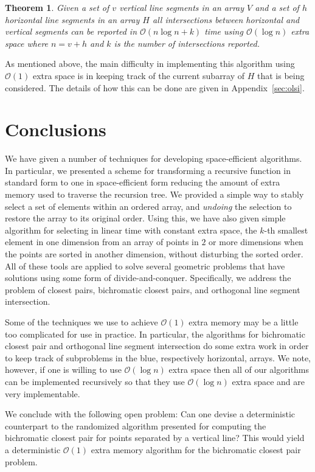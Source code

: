 \documentclass{elsart}
\newcommand{\Oh}[1]{\ensuremath{\mathcal{O}(#1)}}
\newtheorem{theorem}{Theorem}
\begin{document}
\begin{theorem} 
Given a set of $v$ vertical line segments in an array
$V$ and a set of $h$ horizontal line segments in an array $H$
all intersections between horizontal and vertical segments
can be reported in \Oh{n\log n+k} time using \Oh{\log n} extra space
where $n=v+h$ and $k$ is the number of intersections reported.  
\end{theorem}

As mentioned above, the main difficulty in implementing this algorithm
using $\Oh{1}$ extra space is in keeping track of the current subarray
of $H$ that is being considered.  The details of how this can be done
are given in Appendix~\ref{sec:olsi}.


\section{Conclusions}\label{sec:conc}

We have given a number of techniques for developing space-efficient
algorithms.  In particular, we presented a scheme for transforming a
recursive function in standard form to one in space-efficient form
reducing the amount of extra memory used to traverse the recursion
tree.  We provided a simple way to stably select a set of elements
within an ordered array, and {\em undoing} the selection to restore
the array to its original order.  Using this, we have also given
simple algorithm for selecting in linear time with constant extra
space, the $k$-th smallest element in one dimension from an array of
points in $2$ or more dimensions when the points are sorted in another
dimension, without disturbing the sorted order.  All of these tools
are applied to solve several geometric problems that have solutions
using some form of divide-and-conquer.  Specifically, we address the
problem of closest pairs, bichromatic closest pairs, and
orthogonal line segment intersection.

Some of the techniques we use to achieve \Oh{1} extra memory may
be a little too complicated for use in practice.  In particular, the
algorithms for bichromatic closest pair and orthogonal line segment
intersection do some extra work in order to keep track of subproblems
in the blue, respectively horizontal, arrays. We note, however, if one
is willing to use \Oh{\log n} extra space then all of our algorithms
can be implemented recursively so that they use \Oh{\log n} extra
space and are very implementable.

We conclude with the following open problem: Can one devise a
deterministic counterpart to the randomized algorithm presented for
computing the bichromatic closest pair for points separated by a
vertical line?  This would yield a deterministic \Oh{1} extra memory
algorithm for the bichromatic closest pair problem.




\appendix


\end{document}
